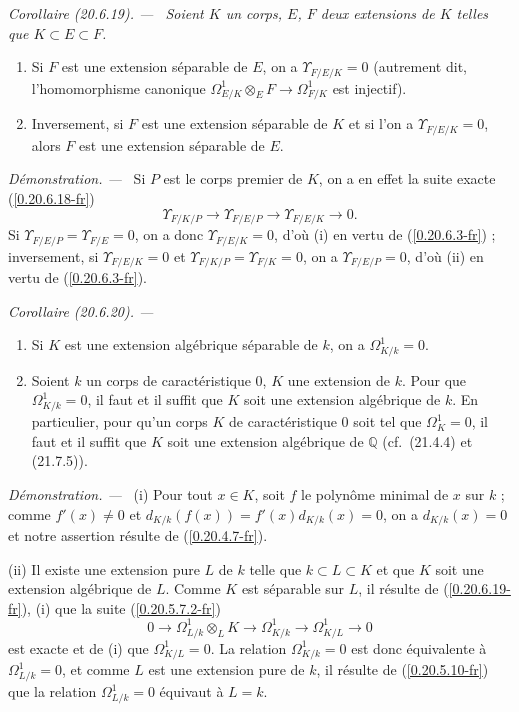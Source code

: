\documentclass[10pt,oneside]{book}
\makeatletter
\newcommand{\sref}[1]{(\ref{#1})}
\newcommand{\setmanualcurrentlabel}[1]{\def\@currentlabel{#1}}
\newcommand{\oldpage}[2][]{%
  \setcounter{footnote}{0}%
  \marginpar{\scriptsize\textbf{#1}~|~#2}\ignorespaces}
\newenvironment{corollary}[1][]{%
  \setmanualcurrentlabel{#1}\par\medskip\noindent\itshape Corollaire (#1). ---\ }{\par}
\newenvironment{proof}{%
  \par\medskip\noindent\textit{Démonstration. ---\ }}{\par}
\makeatother
\begin{document}
\begin{corollary}[20.6.19]
\label{0.20.6.19-fr}
Soient $K$ un corps, $E$, $F$ deux extensions de $K$ telles que
$K\subset E\subset F$.
\begin{enumerate}
  \item[\rm(i)] Si $F$ est une extension séparable de $E$, on a
  $\Upsilon_{F/E/K}=0$ (autrement dit, l'homomorphisme canonique
  $\Omega^1_{E/K}\otimes_E F\to\Omega^1_{F/K}$ est injectif).
  \item[\rm(ii)] Inversement, si $F$ est une extension séparable de $K$ et
  si l'on a $\Upsilon_{F/E/K}=0$, alors $F$ est une extension séparable de
  $E$.
\end{enumerate}
\end{corollary}

\begin{proof}
Si $P$ est le corps premier de $K$, on a en effet la suite exacte
\sref{0.20.6.18-fr}
\[
  \Upsilon_{F/K/P}\to\Upsilon_{F/E/P}\to\Upsilon_{F/E/K}\to0.
\]
Si $\Upsilon_{F/E/P}=\Upsilon_{F/E}=0$, on a donc
$\Upsilon_{F/E/K}=0$, d'où (i) en vertu de \sref{0.20.6.3-fr} ;
inversement, si $\Upsilon_{F/E/K}=0$ et
$\Upsilon_{F/K/P}=\Upsilon_{F/K}=0$, on a
$\Upsilon_{F/E/P}=0$, d'où (ii) en vertu de \sref{0.20.6.3-fr}.
\end{proof}

\oldpage[0\textsubscript{IV-1}]{144}
\begin{corollary}[20.6.20]
\label{0.20.6.20-fr}
\begin{enumerate}
  \item[\rm(i)] Si $K$ est une extension algébrique séparable de $k$, on a
  $\Omega^1_{K/k}=0$.
  \item[\rm(ii)] Soient $k$ un corps de caractéristique 0, $K$ une extension
  de $k$. Pour que $\Omega^1_{K/k}=0$, il faut et il suffit que $K$ soit une
  extension algébrique de $k$. En particulier, pour qu'un corps $K$ de
  caractéristique 0 soit tel que $\Omega^1_K=0$, il faut et il suffit que
  $K$ soit une extension algébrique de $\mathbb{Q}$ (cf.\ (21.4.4) et
  (21.7.5)).
\end{enumerate}
\end{corollary}

\begin{proof}
(i) Pour tout $x\in K$, soit $f$ le polynôme minimal de $x$ sur $k$ ; comme
$f'(x)\ne0$ et $d_{K/k}(f(x))=f'(x)d_{K/k}(x)=0$, on a
$d_{K/k}(x)=0$ et notre assertion résulte de \sref{0.20.4.7-fr}.

(ii) Il existe une extension pure $L$ de $k$ telle que
$k\subset L\subset K$ et que $K$ soit une extension algébrique de $L$.
Comme $K$ est séparable sur $L$, il résulte de \sref{0.20.6.19-fr}, (i) que
la suite \sref{0.20.5.7.2-fr}
\[
  0\to\Omega^1_{L/k}\otimes_L K\to\Omega^1_{K/k}
  \to\Omega^1_{K/L}\to0
\]
est exacte et de (i) que $\Omega^1_{K/L}=0$. La relation
$\Omega^1_{K/k}=0$ est donc équivalente à $\Omega^1_{L/k}=0$, et comme
$L$ est une extension pure de $k$, il résulte de \sref{0.20.5.10-fr} que
la relation $\Omega^1_{L/k}=0$ équivaut à $L=k$.
\end{proof}
\end{document}
